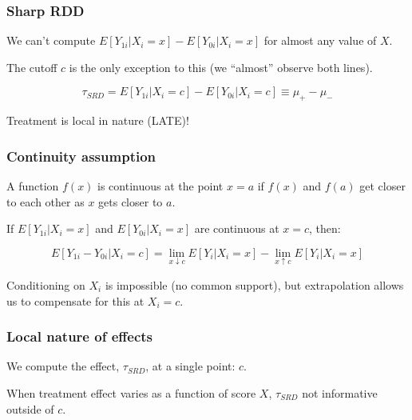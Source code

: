 \documentclass[12pt,english,dvipsnames,aspectratio=169,handout]{beamer}\usepackage[]{graphicx}\usepackage[]{xcolor}
\begin{document}
\begin{frame}
\frametitle{Sharp RDD}

We can't compute $E[Y_{1i} | X_i = x] - E[Y_{0i} | X_i = x]$ for almost any value of $X$.\bigskip
\pause

The cutoff $c$ is the only exception to this (we ``almost'' observe both lines).\bigskip
\pause

\begin{equation}
\tau_{SRD} = E[Y_{1i} | X_i = c] - E[Y_{0i} | X_i = c] \equiv \mu_+ - \mu_-
\end{equation}\bigskip
\pause

Treatment is local in nature (LATE)!

\end{frame}



\begin{frame}
\frametitle{Continuity assumption}
A function $f(x)$ is continuous at the point $x=a$ if $f(x)$ and $f(a)$ get closer to each other as $x$ gets closer to $a$.\bigskip
\pause

If $E[Y_{1i} | X_i = x]$ and $E[Y_{0i} | X_i = x]$ are continuous at $x = c$, then:

\begin{equation}
E[Y_{1i} - Y_{0i} | X_i = c] = \lim_{x \downarrow c}E[Y_i | X_i = x] - \lim_{x \uparrow c}E[Y_i | X_i = x]
\end{equation}
\pause

Conditioning on $X_i$ is impossible (no common support), but extrapolation allows us to compensate for this at $X_i=c$.

\end{frame}



\begin{frame}
\frametitle{Local nature of effects}

We compute the effect, $\tau_{SRD}$, at a single point: $c$.\bigskip
\pause

When treatment effect varies as a function of score $X$, $\tau_{SRD}$ not informative outside of $c$.\pause

\begin{figure}
\centering
{}
\end{figure}

\end{frame}
\end{document}
